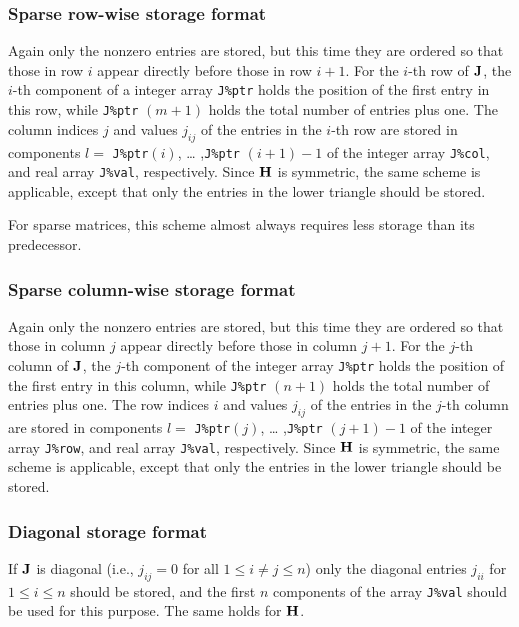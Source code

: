 \documentclass{galahad}
\begin{document}
\subsubsection{Sparse row-wise storage format}\label{rowwise}
Again only the nonzero entries are stored, but this time they are
ordered so that those in row $i$ appear directly before those in row
$i+1$. For the $i$-th row of ${\mathbf{J}}$, the $i$-th component of a integer
array {\tt J\%ptr} holds the position of the first entry in this row,
while {\tt J\%ptr} $(m+1)$ holds the total number of entries plus one.
The column indices $j$ and values $j_{ij}$ of the entries in the
$i$-th row are stored in components $l =$ {\tt J\%ptr}$(i)$, \ldots
,{\tt J\%ptr} $(i+1)-1$ of the integer array {\tt J\%col}, and real
array {\tt J\%val}, respectively.  Since ${\mathbf{H}}$ is symmetric, the same
scheme is applicable, except that only the entries in the lower
triangle should be stored.

For sparse matrices, this scheme almost always requires less storage than 
its predecessor.

\subsubsection{Sparse column-wise storage format}\label{columnwise}
Again only the nonzero entries are stored, but this time they are
ordered so that those in column $j$ appear directly before those in column
$j+1$. For the $j$-th column of ${\mathbf{J}}$, the $j$-th component of the integer
array {\tt J\%ptr} holds the position of the first entry in this column,
while {\tt J\%ptr} $(n+1)$ holds the total number of entries plus one.
The row indices $i$ and values $j_{ij}$ of the entries in the
$j$-th column are stored in components $l =$ {\tt J\%ptr}$(j)$, \ldots
,{\tt J\%ptr} $(j+1)-1$ of the integer array {\tt J\%row}, and real
array {\tt J\%val}, respectively.  Since ${\mathbf{H}}$ is symmetric, the same
scheme is applicable, except that only the entries in the lower
triangle should be stored.

\subsubsection{Diagonal storage format}\label{diagonal}
If ${\mathbf{J}}$ is diagonal (i.e., $j_{ij} = 0$ for all $1 \leq i \neq j
\leq n$) only the diagonal entries $j_{ii}$ for $1 \leq i \leq n$ should
be stored, and the first $n$ components of the array {\tt J\%val}
should be used for this purpose.  The same holds for ${\mathbf{H}}$.
\end{document}
